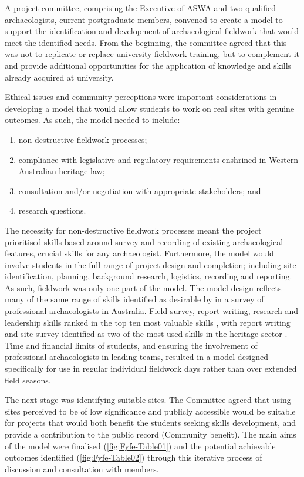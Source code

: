 A project committee, comprising the Executive of ASWA and two qualified archaeologists, current postgraduate members, convened to create a model to support the identification and development of archaeological fieldwork that would meet the identified needs. 
	From the beginning, the committee agreed that this was not to replicate or replace university fieldwork training, but to complement it and provide additional opportunities for the application of knowledge and skills already acquired at university.
	
	Ethical issues and community perceptions were important considerations in developing a model that would allow students to work on real sites with genuine outcomes. As such, the model needed to include:
	
\begin{enumerate}
\item non-destructive fieldwork processes;
\item compliance with legislative and regulatory requirements enshrined in Western Australian heritage law;
\item consultation and/or negotiation with appropriate stakeholders; and
\item research questions.
\end{enumerate}
	
	The necessity for non-destructive fieldwork processes meant the project prioritised skills based around survey and recording of existing archaeological features, crucial skills for any archaeologist. 
	Furthermore, the model would involve students in the full range of project design and completion; including site identification, planning, background research, logistics, recording and reporting. 
	As such, fieldwork was only one part of the model. The model design reflects many of the same range of skills identified as desirable by \textcite[40-41]{ulm2013} in a survey of professional archaeologists in Australia. 
	Field survey, report writing, research and leadership skills ranked in the top ten most valuable skills \parencite[40]{ulm2013}, 
	with report writing and site survey identified as two of the most used skills in the heritage sector \parencite[10]{ireland2013}. 
	Time and financial limits of students, and ensuring the involvement of professional archaeologists in leading teams, resulted in a model designed specifically for use in regular individual fieldwork days rather than over extended field seasons.
	
	The next stage was identifying suitable sites. The Committee agreed that using sites perceived to be of low significance and publicly accessible would be suitable for projects that would both benefit the students seeking skills development, and provide a contribution to the public record (Community benefit). 
	The main aims of the model were finalised (\cref{fig:Fyfe-Table01}) and the potential achievable outcomes identified (\cref{fig:Fyfe-Table02}) through this iterative process of discussion and consultation with members.
	
